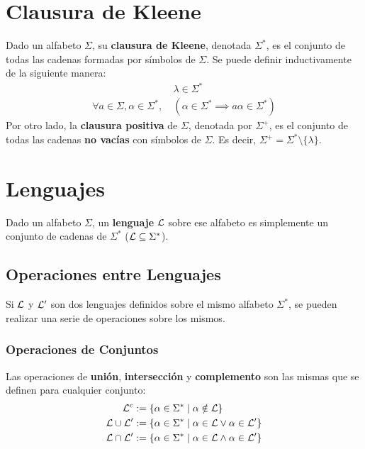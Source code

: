 \section{Clausura de Kleene}

Dado un alfabeto $\Sigma$, su \textbf{clausura de Kleene}, denotada $\Sigma^*$, es el conjunto de todas las cadenas formadas por símbolos de $\Sigma$. Se puede definir inductivamente de la siguiente manera:
$$
\begin{aligned}
    & \lambda \in \Sigma^* \\
    \forall a \in \Sigma, \alpha \in \Sigma^*,\ & (\alpha \in \Sigma^* \implies a \alpha \in \Sigma^*)
\end{aligned}
$$
Por otro lado, la \textbf{clausura positiva} de $\Sigma$, denotada por $\Sigma^+$, es el conjunto de todas las cadenas \textbf{no vacías} con símbolos de $\Sigma$. Es decir, $\Sigma^+ = \Sigma^* \setminus \{\lambda\}$.

\section{Lenguajes}

Dado un alfabeto $\Sigma$, un \textbf{lenguaje} $\mathcal{L}$ sobre ese alfabeto es simplemente un conjunto de cadenas de $\Sigma^*$ ($\mathcal{L} \subseteq \Sigma^*$).

\subsection{Operaciones entre Lenguajes}

Si $\mathcal{L}$ y $\mathcal{L}'$ son dos lenguajes definidos sobre el mismo alfabeto $\Sigma^*$, se pueden realizar una serie de operaciones sobre los mismos.

\subsubsection{Operaciones de Conjuntos}

Las operaciones de \textbf{unión}, \textbf{intersección} y \textbf{complemento} son las mismas que se definen para cualquier conjunto:
$$
\begin{aligned}
    \mathcal{L}^c & := \{\alpha \in \Sigma^* \mid \alpha \notin \mathcal{L}\} \\
    \mathcal{L} \cup \mathcal{L}' & := \{\alpha \in \Sigma^* \mid \alpha \in \mathcal{L} \lor \alpha \in \mathcal{L}'\} \\
    \mathcal{L} \cap \mathcal{L}' & := \{\alpha \in \Sigma^* \mid \alpha \in \mathcal{L} \land \alpha \in \mathcal{L}'\} \\
\end{aligned}
$$

